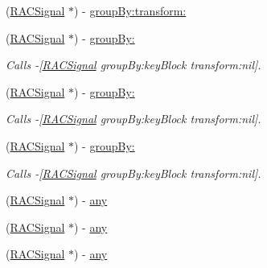 \begin{DoxyCompactItemize}
(\mbox{\hyperlink{interface_r_a_c_signal}{R\+A\+C\+Signal}} $\ast$) -\/ \mbox{\hyperlink{interface_r_a_c_signal_ad04cf174e24905df96f211b60e31a3cd}{group\+By\+:transform\+:}}
\item 
\mbox{\label{interface_r_a_c_signal_a35f9a656ad047d90f6997aee136782e5}} 
(\mbox{\hyperlink{interface_r_a_c_signal}{R\+A\+C\+Signal}} $\ast$) -\/ \mbox{\hyperlink{interface_r_a_c_signal_a35f9a656ad047d90f6997aee136782e5}{group\+By\+:}}
\begin{DoxyCompactList}\small\item\em Calls -\/\mbox{[}\mbox{\hyperlink{interface_r_a_c_signal}{R\+A\+C\+Signal}} group\+By\+:key\+Block transform\+:nil\mbox{]}. \end{DoxyCompactList}\item 
\mbox{\label{interface_r_a_c_signal_a35f9a656ad047d90f6997aee136782e5}} 
(\mbox{\hyperlink{interface_r_a_c_signal}{R\+A\+C\+Signal}} $\ast$) -\/ \mbox{\hyperlink{interface_r_a_c_signal_a35f9a656ad047d90f6997aee136782e5}{group\+By\+:}}
\begin{DoxyCompactList}\small\item\em Calls -\/\mbox{[}\mbox{\hyperlink{interface_r_a_c_signal}{R\+A\+C\+Signal}} group\+By\+:key\+Block transform\+:nil\mbox{]}. \end{DoxyCompactList}\item 
\mbox{\label{interface_r_a_c_signal_a35f9a656ad047d90f6997aee136782e5}} 
(\mbox{\hyperlink{interface_r_a_c_signal}{R\+A\+C\+Signal}} $\ast$) -\/ \mbox{\hyperlink{interface_r_a_c_signal_a35f9a656ad047d90f6997aee136782e5}{group\+By\+:}}
\begin{DoxyCompactList}\small\item\em Calls -\/\mbox{[}\mbox{\hyperlink{interface_r_a_c_signal}{R\+A\+C\+Signal}} group\+By\+:key\+Block transform\+:nil\mbox{]}. \end{DoxyCompactList}\item 
(\mbox{\hyperlink{interface_r_a_c_signal}{R\+A\+C\+Signal}} $\ast$) -\/ \mbox{\hyperlink{interface_r_a_c_signal_af64359cf92ab95039f48270a71446e08}{any}}
\item 
(\mbox{\hyperlink{interface_r_a_c_signal}{R\+A\+C\+Signal}} $\ast$) -\/ \mbox{\hyperlink{interface_r_a_c_signal_af64359cf92ab95039f48270a71446e08}{any}}
\item 
(\mbox{\hyperlink{interface_r_a_c_signal}{R\+A\+C\+Signal}} $\ast$) -\/ \mbox{\hyperlink{interface_r_a_c_signal_af64359cf92ab95039f48270a71446e08}{any}}

\end{DoxyCompactItemize}
